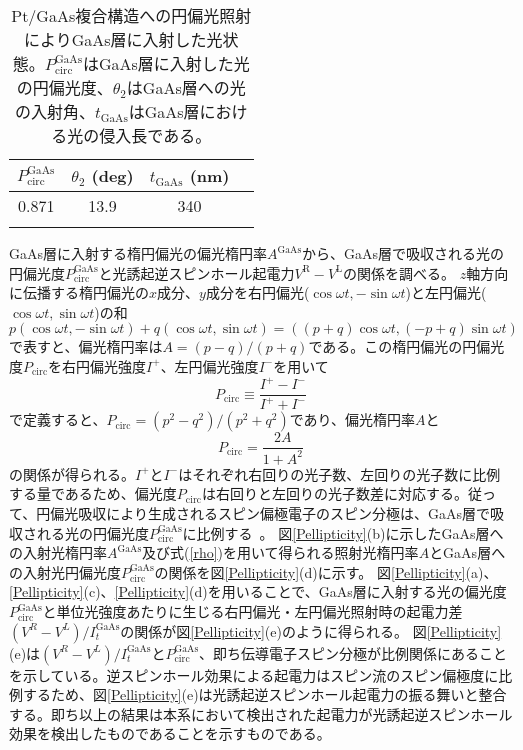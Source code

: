 \begin{table}[tbp]
\begin{center}
\caption{Pt/GaAs複合構造への円偏光照射によりGaAs層に入射した光状態。$P^\text{GaAs}_\text{circ}$はGaAs層に入射した光の円偏光度、$\theta_2$はGaAs層への光の入射角、$t_\text{GaAs}$はGaAs層における光の侵入長である。 }
\begin{tabular}{cccc} 
\hline\hline
$P^\text{GaAs}_\text{circ}$ & $\theta_2$ (deg) & $t_\text{GaAs}$ (nm) \\
\hline
0.871 & 13.9 & 340 \\
\hline\hline
\label{resuresu}
\end{tabular}
\end{center}
\end{table}



GaAs層に入射する楕円偏光の偏光楕円率$A^\text{GaAs}$から、GaAs層で吸収される光の円偏光度$P^\text{GaAs}_\text{circ}$と光誘起逆スピンホール起電力$V^\text{R}-V^\text{L}$の関係を調べる。
$z$軸方向に伝播する楕円偏光の$x$成分、$y$成分を右円偏光($\cos\omega t, -\sin \omega t$)と左円偏光($\cos\omega t, \sin \omega t$)の和
$p(\cos\omega t, -\sin \omega t)+q(\cos\omega t, \sin \omega t)=((p+q)\cos\omega t,(-p+q)\sin \omega t)$
で表すと、偏光楕円率は$A=(p-q)/(p+q)$である。この楕円偏光の円偏光度$P_\text{circ}$を右円偏光強度$I^+$、左円偏光強度$I^-$を用いて
\begin{equation}
P_\text{circ}\equiv \frac{I^+-I^-}{I^++I^-}
\end{equation}
で定義すると、$P_\text{circ}=(p^2-q^2)/(p^2+q^2)$であり、偏光楕円率$A$と
\begin{equation}
P_\text{circ}=\frac{2A}{1+A^2}\label{rho}
\end{equation}
の関係が得られる。$I^+$と$I^-$はそれぞれ右回りの光子数、左回りの光子数に比例する量であるため、偏光度$P_\text{circ}$は右回りと左回りの光子数差に対応する。従って、円偏光吸収により生成されるスピン偏極電子のスピン分極は、GaAs層で吸収される光の円偏光度$P^\text{GaAs}_\text{circ}$に比例する~\cite{Pierce,Meier}。
図\ref{Pellipticity}(b)に示したGaAs層への入射光楕円率$A^\text{GaAs}$及び式(\ref{rho})を用いて得られる照射光楕円率$A$とGaAs層への入射光円偏光度$P^\text{GaAs}_\text{circ}$の関係を図\ref{Pellipticity}(d)に示す。
図\ref{Pellipticity}(a)、\ref{Pellipticity}(c)、\ref{Pellipticity}(d)を用いることで、GaAs層に入射する光の偏光度$P^\text{GaAs}_\text{circ}$と単位光強度あたりに生じる右円偏光・左円偏光照射時の起電力差$(V^R-V^L)/I_t^\text{GaAs}$の関係が図\ref{Pellipticity}(e)のように得られる。
図\ref{Pellipticity}(e)は$(V^R-V^L)/I_t^\text{GaAs}$と$P^\text{GaAs}_\text{circ}$、即ち伝導電子スピン分極が比例関係にあることを示している。逆スピンホール効果による起電力はスピン流のスピン偏極度に比例するため、図\ref{Pellipticity}(e)は光誘起逆スピンホール起電力の振る舞いと整合する。即ち以上の結果は本系において検出された起電力が光誘起逆スピンホール効果を検出したものであることを示すものである。






